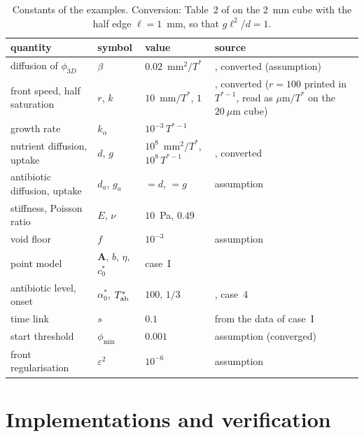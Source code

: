 \documentclass[11pt,a4paper]{article}
\newcommand{\phiD}{\phi_{3D}}
\begin{document}
\begin{table}[tbp]
  \centering
  \caption{Constants of the examples. Conversion: Table~2 of \citet{Klempt2024DiffusionDrivenGrowth} on the 2~mm cube with the half edge $\ell=1$~mm, so that $g\ell^2/d=1$.}
  \label{tab:parameters}
  \footnotesize
  \setlength{\tabcolsep}{4pt}
  \begin{tabular}{lll>{\raggedright\arraybackslash}p{5.2cm}}
    \toprule
    quantity & symbol & value & source \\
    \midrule
    diffusion of $\phiD$ & $\beta$ & $0.02$~mm$^2/T^*$ & \citet{Klempt2024DiffusionDrivenGrowth}, converted (assumption) \\
    front speed, half saturation & $r$, $k$ & $10$~mm$/T^*$, $1$ & \citet{Klempt2024DiffusionDrivenGrowth}, converted ($r=100$ printed in $T^{*-1}$, read as $\mu$m$/T^*$ on the $20~\mu$m cube) \\
    growth rate & $k_\alpha$ & $10^{-3}\,T^{*-1}$ & \citet{Klempt2024DiffusionDrivenGrowth} \\
    nutrient diffusion, uptake & $d$, $g$ & $10^8$~mm$^2/T^*$, $10^8\,T^{*-1}$ & \citet{Klempt2024DiffusionDrivenGrowth}, converted \\
    antibiotic diffusion, uptake & $d_a$, $g_a$ & $=d$, $=g$ & assumption \\
    stiffness, Poisson ratio & $E$, $\nu$ & $10$~Pa, $0.49$ & \citet{Klempt2024DiffusionDrivenGrowth} \\
    void floor & $f$ & $10^{-3}$ & assumption \\
    point model & $\mathbf A$, $b$, $\eta$, $c^*_0$ & case~I & \citet{Fritsch2025BayesianMicrofilms} \\
    antibiotic level, onset & $\alpha^*_0$, $T^*_{\rm ab}$ & $100$, $1/3$ & \citet{Klempt2026ContinuumBacterialGrowth}, case~4 \\
    time link & $s$ & $0.1$ & from the data of case~I \\
    start threshold & $\phi_{\min}$ & $0.001$ & assumption (converged) \\
    front regularisation & $\varepsilon^2$ & $10^{-6}$ & assumption \\
    \bottomrule
  \end{tabular}
\end{table}

\section{Implementations and verification}
\label{sec:verification}
\end{document}
